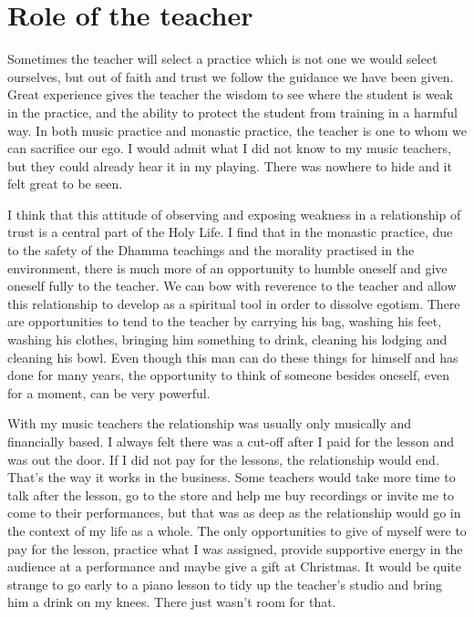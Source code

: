 \section{Role of the teacher}

Sometimes the teacher will select a practice which is not one we would
select ourselves, but out of faith and trust we follow the guidance we
have been given. Great experience gives the teacher the wisdom to see
where the student is weak in the practice, and the ability to protect
the student from training in a harmful way. In both music practice and
monastic practice, the teacher is one to whom we can sacrifice our ego. 
I would admit what I did not know to my music teachers, but they could
already hear it in my playing. There was nowhere to hide and it felt
great to be seen. 

I think that this attitude of observing and exposing weakness in a
relationship of trust is a central part of the Holy Life. I find that in
the monastic practice, due to the safety of the Dhamma teachings and the
morality practised in the environment, there is much more of an
opportunity to humble oneself and give oneself fully to the teacher. We
can bow with reverence to the teacher and allow this relationship to
develop as a spiritual tool in order to dissolve egotism. There are
opportunities to tend to the teacher by carrying his bag, washing his
feet, washing his clothes, bringing him something to drink, cleaning his
lodging and cleaning his bowl. Even though this man can do these things
for himself and has done for many years, the opportunity to think of
someone besides oneself, even for a moment, can be very powerful. 

With my music teachers the relationship was usually only musically and
financially based. I always felt there was a cut-off after I paid for
the lesson and was out the door. If I did not pay for the lessons, the
relationship would end. That's the way it works in the business. Some
teachers would take more time to talk after the lesson, go to the store
and help me buy recordings or invite me to come to their performances, 
but that was as deep as the relationship would go in the context of my
life as a whole. The only opportunities to give of myself were to pay
for the lesson, practice what I was assigned, provide supportive energy
in the audience at a performance and maybe give a gift at Christmas. It
would be quite strange to go early to a piano lesson to tidy up the
teacher's studio and bring him a drink on my knees. There just wasn't
room for that. 

